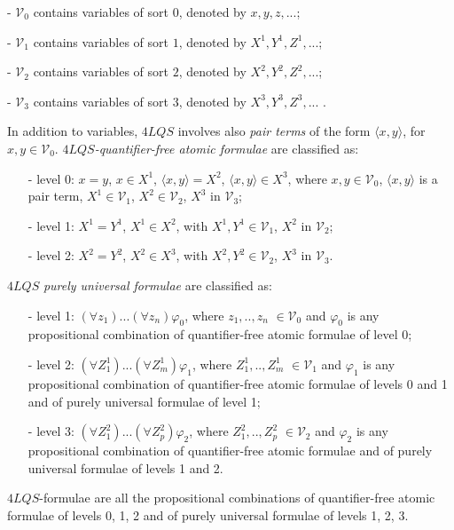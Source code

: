 \documentclass[a4paper]{llncs}
\begin{document}
\smallskip
{-  $\mathcal{V}_0$ contains variables of sort $0$, denoted by $x, y, z, ...$; }

{- $\mathcal{V}_1 $ contains variables of sort $1$, denoted by $X^1,Y^1,Z^1,... $; }

{- $\mathcal{V}_2$  contains variables of sort $2$, denoted by $X^2,Y^2,Z^2,... $;}

{- $\mathcal{V}_3$ contains variables of sort $3$, denoted by $X^3,Y^3,Z^3,...$ .}

\medskip
\noindent
In addition to variables, $4LQS$ involves also \emph{pair terms} of the form $\langle x,y \rangle$, for $ x,y \in \mathcal{V}_0$.
\emph{$4LQS$-quantifier-free atomic formulae} are classified as:
\begin{itemize}
\item[-] {level 0: $x=y$, $x \in X^1$, $\langle x,y \rangle = X^2$, $\langle x,y \rangle \in X^3$, where $x,y \in \mathcal{V}_0$, $\langle x,y \rangle$ is a pair term, $X^1 \in\mathcal{V}_1$, $X^2\in \mathcal{V}_2$, $X^3$ in $\mathcal{V}_3$;}
\item[-] {level 1: $X^1=Y^1$, $X^1 \in X^2$, with $X^1,Y^1 \in \mathcal{V}_1$, $X^2$ in $\mathcal{V}_2$;}
\item[-] {level 2: $X^2=Y^2$, $X^2 \in X^3$, with $X^2, Y^2 \in \mathcal{V}_2$, $X^3$ in $\mathcal{V}_3$.}
\end{itemize}

\noindent $4LQS$ \emph{purely universal formulae} are classified as:

\begin{itemize}
\item[-] { level 1: $(\forall z_1)...(\forall z_n) \varphi _0$, where $z_1,..,z_n$  $\in \mathcal{V}_0$ and $\varphi _0$ is any propositional combination of quantifier-free atomic formulae of level 0;}
\item[-] { level 2: $(\forall Z^1_1)...(\forall Z^1_m) \varphi _1$, where $Z^1_1,..,Z^1_m $  $\in \mathcal{V}_1$ and $\varphi _1$ is any propositional combination of quantifier-free atomic formulae of levels 0 and 1 and of purely universal formulae of level 1;}
\item[-] {level 3: $(\forall Z^2_1)...(\forall Z^2_p) \varphi _2$, where $Z^2_1,..,Z^2_p $  $\in \mathcal{V}_2$ and $\varphi _2$ is any propositional combination of quantifier-free atomic formulae and of purely universal formulae of levels 1 and 2.}
\end{itemize}

\noindent
$4LQS$-formulae are all the propositional combinations of quantifier-free atomic formulae of levels 0, 1, 2 and of purely universal formulae of levels 1, 2, 3.
\end{document}
